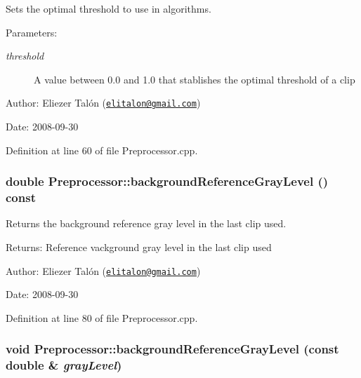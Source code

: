 Sets the optimal threshold to use in algorithms. 

\begin{Desc}
\item[Parameters:]
\begin{description}
\item[{\em threshold}]A value between 0.0 and 1.0 that stablishes the optimal threshold of a clip\end{description}
\end{Desc}
\begin{Desc}
\item[Author:]Eliezer Talón (\href{mailto:elitalon@gmail.com}{\tt elitalon@gmail.com}) \end{Desc}
\begin{Desc}
\item[Date:]2008-09-30 \end{Desc}


Definition at line 60 of file Preprocessor.cpp.\hypertarget{class_preprocessor_159a9059fc811585eb9363e76ad16148}{
\subsubsection[backgroundReferenceGrayLevel]{\setlength{\rightskip}{0pt plus 5cm}double Preprocessor::backgroundReferenceGrayLevel () const}}
\label{class_preprocessor_159a9059fc811585eb9363e76ad16148}


Returns the background reference gray level in the last clip used. 

\begin{Desc}
\item[Returns:]Reference vackground gray level in the last clip used\end{Desc}
\begin{Desc}
\item[Author:]Eliezer Talón (\href{mailto:elitalon@gmail.com}{\tt elitalon@gmail.com}) \end{Desc}
\begin{Desc}
\item[Date:]2008-09-30 \end{Desc}


Definition at line 80 of file Preprocessor.cpp.\hypertarget{class_preprocessor_df20888f57b15f02ae0d7df536d97ef4}{
\subsubsection[backgroundReferenceGrayLevel]{\setlength{\rightskip}{0pt plus 5cm}void Preprocessor::backgroundReferenceGrayLevel (const double \& {\em grayLevel})}}
\label{class_preprocessor_df20888f57b15f02ae0d7df536d97ef4}



